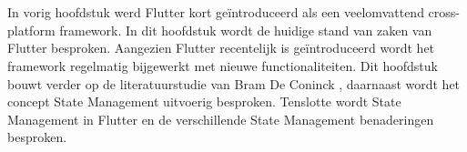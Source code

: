 \chapter{}
\label{ch:stand-van-zaken}

\newcommand\figureWidthModifier{0.6}



%
%

In vorig hoofdstuk werd Flutter kort geïntroduceerd als een veelomvattend cross-platform framework. In dit hoofdstuk wordt de huidige stand van zaken van Flutter besproken. Aangezien Flutter recentelijk is geïntroduceerd wordt het framework regelmatig bijgewerkt met nieuwe functionaliteiten. Dit hoofdstuk bouwt verder op de literatuurstudie van Bram De Coninck \autocite{DeConinck2019}, daarnaast wordt het concept State Management uitvoerig besproken. Tenslotte wordt State Management in Flutter en de verschillende State Management benaderingen besproken. 
\newline

